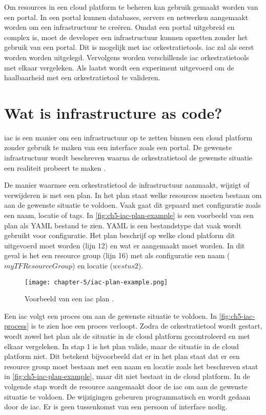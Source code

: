 Om resources in een cloud platform te beheren kan gebruik gemaakt worden van een portal. In een portal kunnen databases, servers en netwerken aangemaakt worden om een infrastructuur te creëren. Omdat een portal uitgebreid en complex is, moet de developer een infrastructuur kunnen opzetten zonder het gebruik van een portal. Dit is mogelijk met \acrfull{iac} orkestratietools. \Acrshort{iac} zal als eerst worden worden uitgelegd. Vervolgens worden verschillende \Acrshort{iac} orkestratietools met elkaar vergeleken. Als laatst wordt een experiment uitgevoerd om de haalbaarheid met een orkestratietool te valideren.

\section{Wat is infrastructure as code?}\label{subsec:ch5-wat-is-infrastructure-as-code}
\acrshort{iac} is een manier om een infrastructuur op te zetten binnen een cloud platform zonder gebruik te maken van een interface zoals een portal. De gewenste infrastructuur wordt beschreven waarna de orkestratietool de gewenste situatie een realiteit probeert te maken \cite{iac-amazon-web-services-in-action}.

De manier waarmee een orkestratietool de infrastructuur aanmaakt, wijzigt of verwijderen is met een plan. In het plan staat welke resources moeten bestaan om aan de gewenste situatie te voldoen. Vaak gaat dit gepaard met configuratie zoals een naam, locatie of tags. In \autoref{fig:ch5-iac-plan-example} is een voorbeeld van een plan als YAML bestand te zien. YAML is een bestandstype dat vaak wordt gebruikt voor configuratie. Het plan beschrijf op welke cloud platform dit uitgevoerd moet worden (lijn 12) en wat er aangemaakt moet worden. In dit geval is het een resource group (lijn 16) met als configuratie een naam (\(myTFResourceGroup\)) en locatie (\(westus2\)).

\begin{figure}[hbt!]
  \centering
  \texttt{[image: chapter-5/iac-plan-example.png]}
  \caption{Voorbeeld van een \acrfull{iac} plan \cite{terraform-plan-example}.}
  \label{fig:ch5-iac-plan-example}
\end{figure}

Een \Acrshort{iac} volgt een proces om aan de gewenste situatie te voldoen. In \autoref{fig:ch5-iac-process} is te zien hoe een proces verloopt. Zodra de orkestratietool wordt gestart, wordt zowel het plan als de situatie in de cloud platform gecontroleerd en met elkaar vergeleken. In stap 1 is het plan valide, maar de situatie in de cloud platform niet. Dit betekent bijvoorbeeld dat er in het plan staat dat er een resource group moet bestaan met een naam en locatie zoals het beschreven staat in \autoref{fig:ch5-iac-plan-example}, maar dit niet bestaat in de cloud platform. In de volgende stap wordt de resource aangemaakt door de \Acrshort{iac} om aan de gewenste situatie te voldoen. De wijzigingen gebeuren programmatisch en wordt gedaan door de \Acrshort{iac}. Er is geen tussenkomst van een persoon of interface nodig. 

